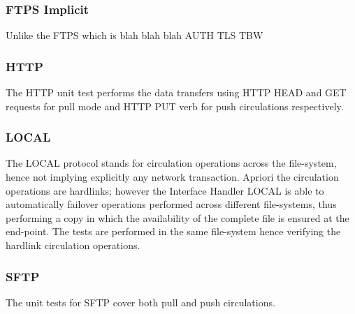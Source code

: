 \documentclass[dec_sum_main.tex]{subfiles}
\begin{document}
 \newline

 \newline

\subsubsection{FTPS Implicit}
Unlike the FTPS which is blah blah blah
AUTH TLS
TBW



\subsubsection{HTTP}
The HTTP unit test performs the data transfers using HTTP HEAD and GET requests for pull mode and HTTP PUT verb for push circulations respectively. \newline

 \newline

 \newline

\subsubsection{LOCAL}
The LOCAL protocol stands for circulation operations across the file-system, hence not implying explicitly any network transaction. Apriori the circulation operations are hardlinks; however the Interface Handler LOCAL is able to automatically failover operations performed across different file-systems, thus performing a copy in which the availability of the complete file is ensured at the end-point. The tests are performed in the same file-system hence verifying the hardlink circulation operations. \newline  

 \newline

 \newline


\subsubsection{SFTP}
The unit tests for SFTP cover both pull and push circulations.\newline
\end{document}
